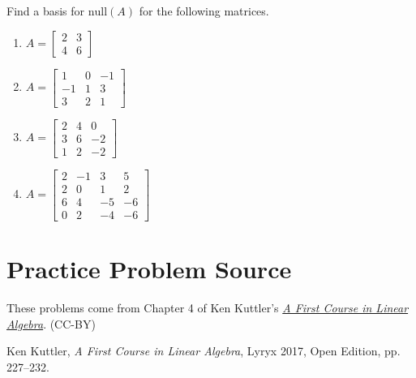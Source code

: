 \documentclass{ximera}
\begin{document}
\begin{problem}\label{prb:5.38} Find a basis for $\mbox{null} \left(A \right)$ for the following matrices.

\begin{enumerate}
\item
$A = \left[ \begin{array}{rr}
2 & 3 \\
4 & 6
\end{array} \right] $

\item
$A = \left[ \begin{array}{rrr}
1 & 0 & -1 \\
-1 & 1 & 3 \\
3 & 2 & 1
\end{array} \right]$

\item
$A = \left[ \begin{array}{rrr}
2 & 4 & 0 \\
3 & 6 & -2 \\
1 & 2 & -2
\end{array} \right]$

\item
$ A = \left[ \begin{array}{rrrr}
2 & -1 & 3 & 5 \\
2 & 0 & 1 & 2 \\
6 & 4 & -5 & -6 \\
0 & 2 & -4 & -6
\end{array} \right]$

\end{enumerate}
\end{problem}

\section*{Practice Problem Source}
These problems come from Chapter 4 of Ken Kuttler's \href{https://open.umn.edu/opentextbooks/textbooks/a-first-course-in-linear-algebra-2017}{\it A First Course in Linear Algebra}. (CC-BY)

Ken Kuttler, {\it  A First Course in Linear Algebra}, Lyryx 2017, Open Edition, pp. 227--232.  
\end{document}
